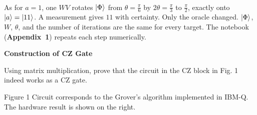 \documentclass[a4paper, 10pt]{article}
\begin{document}
\begin{solution}
\begin{align*}
	\end{align*}
	As for \( a = 1 \), one \( WV \) rotates \( \ket{\Phi} \) from \( \theta = \tfrac{\pi}{6} \) by \( 2\theta = \tfrac{\pi}{3} \) to \( \tfrac{\pi}{2} \), exactly onto \( \ket{a} = \ket{11} \). A measurement gives \( 11 \) with certainty.
	Only the oracle changed. \( \ket{\Phi} \), \( W \), \( \theta \), and the number of iterations are the same for every target. The notebook (\textbf{Appendix~1}) repeats each step numerically.
\end{solution}

\begin{problem}
\textbf{Construction of CZ Gate}
\par Using matrix multiplication, prove that the circuit in the CZ block in Fig. 1 indeed works as a CZ gate.


\begin{center}
	{
		\footnotesize Figure 1 Circuit corresponds to the Grover's algorithm implemented in IBM-Q. \\
		The hardware result is shown on the right.
	}
\end{center}
\end{problem}
\end{document}
